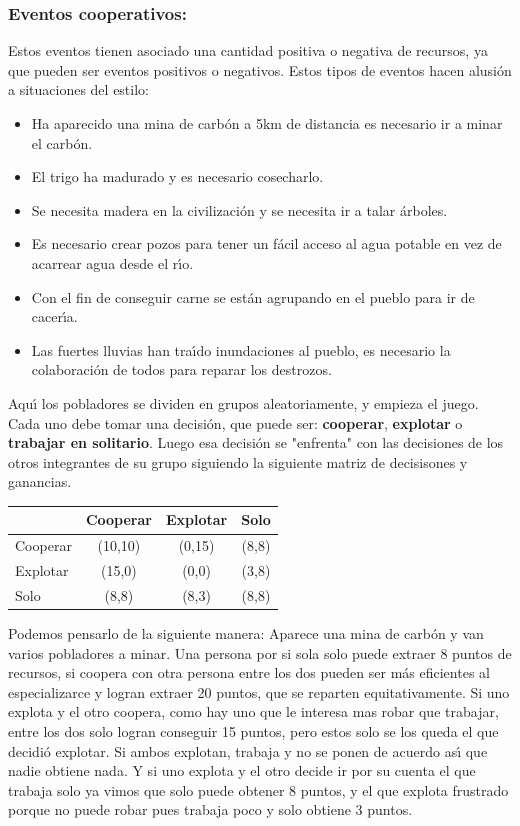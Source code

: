 \documentclass{article}
\begin{document}
\subsubsection{Eventos cooperativos:}
Estos eventos tienen asociado una cantidad positiva o negativa de recursos, ya que pueden ser eventos positivos o negativos. Estos tipos de eventos hacen alusi\'on a situaciones del estilo:
\begin{itemize}
      \item Ha aparecido una mina de carb\'on a 5km de distancia es necesario ir a minar el carb\'on.
      \item El trigo ha madurado y es necesario cosecharlo.
      \item Se necesita madera en la civilizaci\'on y se necesita ir a talar \'arboles.
      \item Es necesario crear pozos para tener un f\'acil acceso al agua potable en vez de acarrear agua desde el r\'{\i}o.
      \item Con el fin de conseguir carne se est\'an agrupando en el pueblo para ir de cacer\'{\i}a.
      \item Las fuertes lluvias han tra\'{\i}do inundaciones al pueblo, es necesario la colaboraci\'on de todos para reparar los destrozos.
\end{itemize}
Aqu\'{\i} los pobladores se dividen en grupos aleatoriamente, y empieza el juego. Cada uno debe tomar una decisi\'on, que puede ser: \textbf{cooperar},
\textbf{explotar} o \textbf{trabajar en solitario}. Luego esa decisi\'on se "enfrenta" con las decisiones de los otros integrantes de su grupo siguiendo la
siguiente matriz de decisisones y ganancias.
\vspace*{2mm}
\begin{center}
      \begin{tabular}{|l|c|c|c|}
            \hline
                     & Cooperar & Explotar & Solo  \\
            \hline
            Cooperar & (10,10)  & (0,15)   & (8,8) \\
            \hline
            Explotar & (15,0)   & (0,0)    & (3,8) \\
            \hline
            Solo     & (8,8)    & (8,3)    & (8,8) \\
            \hline
      \end{tabular}
\end{center}
Podemos pensarlo de la siguiente manera: Aparece una mina de carb\'on y van varios pobladores a minar. Una persona por si sola solo
puede extraer 8 puntos de recursos, si coopera con otra persona entre los dos pueden ser m\'as eficientes al especializarce y logran
extraer 20 puntos, que se reparten equitativamente. Si uno explota y el otro coopera, como hay uno que le interesa mas robar que trabajar,
entre los dos solo logran conseguir 15 puntos, pero estos solo se los queda el que decidi\'o explotar. Si ambos explotan, trabaja y no
se ponen de acuerdo as\'{\i} que nadie obtiene nada. Y si uno explota y el otro decide ir por su cuenta el que trabaja solo ya vimos que
solo puede obtener 8 puntos, y el que explota frustrado porque no puede robar pues trabaja poco y solo obtiene 3 puntos.
\end{document}

